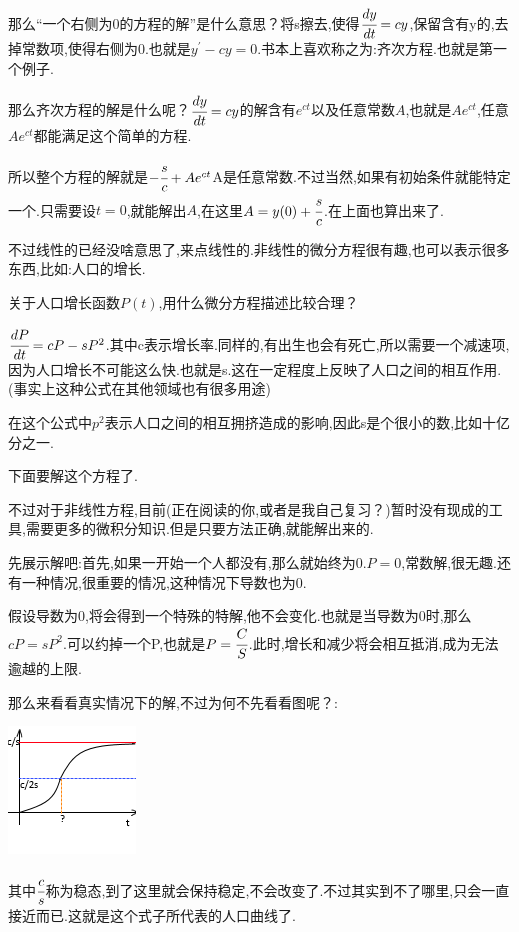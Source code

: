 \documentclass[UTF8,12pt]{ctexbook}
\newcommand{\derivative}{^\prime}
\begin{document}
{{{{  那么“一个右侧为0的方程的解”是什么意思？将s擦去,使得$\cfrac{dy}{dt} = cy$,保留含有y的,去掉常数项,使得右侧为0.也就是$y\derivative - cy = 0$.书本上喜欢称之为:齐次方程.也就是第一个例子.

  那么齐次方程的解是什么呢？$\cfrac{dy}{dt} = cy$的解含有$e^{ct}$以及任意常数$A$,也就是$Ae^{ct}$,任意$Ae^{ct}$都能满足这个简单的方程.

  所以整个方程的解就是$-\cfrac{s}{c} + Ae^{ct}$A是任意常数.不过当然,如果有初始条件就能特定一个.只需要设$t = 0$,就能解出$A$,在这里$A = y(0) + \cfrac{s}{c}$.在上面也算出来了.

  不过线性的已经没啥意思了,来点线性的.非线性的微分方程很有趣,也可以表示很多东西,比如:人口的增长.

  关于人口增长函数$P(t)$,用什么微分方程描述比较合理？

  $\cfrac{dP}{dt} = cP - sP^2$.其中c表示增长率.同样的,有出生也会有死亡,所以需要一个减速项,因为人口增长不可能这么快.也就是s.这在一定程度上反映了人口之间的相互作用.(事实上这种公式在其他领域也有很多用途)

  在这个公式中$p^2$表示人口之间的相互拥挤造成的影响,因此s是个很小的数,比如十亿分之一.

  下面要解这个方程了.

  不过对于非线性方程,目前(正在阅读的你,或者是我自己复习？)暂时没有现成的工具,需要更多的微积分知识.但是只要方法正确,就能解出来的.

  先展示解吧:首先,如果一开始一个人都没有,那么就始终为0.$P = 0$,常数解,很无趣.还有一种情况,很重要的情况,这种情况下导数也为0.

  假设导数为0,将会得到一个特殊的特解,他不会变化.也就是当导数为0时,那么$cP = sP^2$.可以约掉一个P,也就是$P = \cfrac{C}{S}$.此时,增长和减少将会相互抵消,成为无法逾越的上限.

  那么来看看真实情况下的解,不过为何不先看看图呢？:

  \begin{center}
    \includegraphics{resources/nonLinearDifferencialEquation_HumanGrow.png}
  \end{center}

  其中$\cfrac{c}{s}$称为稳态,到了这里就会保持稳定,不会改变了.不过其实到不了哪里,只会一直接近而已.这就是这个式子所代表的人口曲线了.

}}}}
\end{document}
